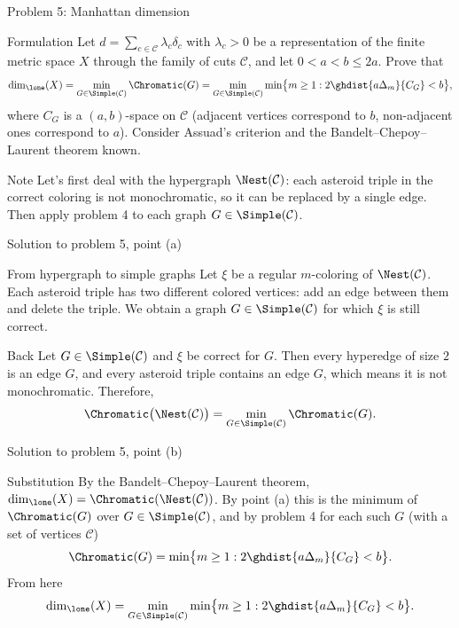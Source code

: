 \documentclass[aspectratio=169,11pt]{beamer}
\begin{document}
\begin{frame}{Problem \textup{5}: Manhattan dimension}
\begin{block}{Formulation}
Let $d = \sum_{c \in \mathcal C} \lambda_c \delta_c$ with $\lambda_c > 0$ be a representation of the finite metric space $X$ through the family of cuts $\mathcal C$, and let $0 < a < b \le 2a$. Prove that
\[
\dim_{\lone}(X) = \min_{G \in \Simple(\mathcal C)} \Chromatic(G)
= \min_{G \in \Simple(\mathcal C)} \min\bigl\{ m \ge 1 : 2 \ghdist{a\Delta_m}{C_G} < b \bigr\},
\]
where $C_G$ is a $(a,b)$-space on $\mathcal C$ (adjacent vertices correspond to $b$, non-adjacent ones correspond to $a$). Consider Assuad's criterion and the Bandelt--Chepoy--Laurent theorem known.
\end{block}
\begin{block}{Note}
Let's first deal with the hypergraph $\Nest(\mathcal C)$: each asteroid triple in the correct coloring is not monochromatic, so it can be replaced by a single edge. Then apply problem \textup{4} to each graph $G \in \Simple(\mathcal C)$.
\end{block}
\end{frame}

\begin{frame}{Solution to problem \textup{5}, point \textup{(a)}}
\begin{block}{From hypergraph to simple graphs}
Let $\xi$ be a regular $m$-coloring of $\Nest(\mathcal C)$. Each asteroid triple has two different colored vertices\textup{:} add an edge between them and delete the triple. We obtain a graph $G \in \Simple(\mathcal C)$ for which $\xi$ is still correct.
\end{block}
\begin{block}{Back}
Let $G \in \Simple(\mathcal C)$ and $\xi$ be correct for $G$. Then every hyperedge of size $2$ is an edge $G$, and every asteroid triple contains an edge $G$, which means it is not monochromatic. Therefore,
\[
\Chromatic\bigl(\Nest(\mathcal C)\bigr) = \min_{G \in \Simple(\mathcal C)} \Chromatic(G).
\]
\end{block}
\end{frame}

\begin{frame}{Solution to problem \textup{5}, point \textup{(b)}}
\begin{block}{Substitution}
By the Bandelt--Chepoy--Laurent theorem, $\dim_{\lone}(X) = \Chromatic(\Nest(\mathcal C))$. By point \textup{(a)} this is the minimum of $\Chromatic(G)$ over $G \in \Simple(\mathcal C)$, and by problem \textup{4} for each such $G$ (with a set of vertices $\mathcal C$)
\[
\Chromatic(G) = \min\bigl\{ m \ge 1 : 2 \ghdist{a\Delta_m}{C_G} < b \bigr\}.
\]
From here
\[
\dim_{\lone}(X) = \min_{G \in \Simple(\mathcal C)} \min\bigl\{ m \ge 1 : 2 \ghdist{a\Delta_m}{C_G} < b \bigr\}.
\]
\end{block}
\end{frame}
\end{document}
